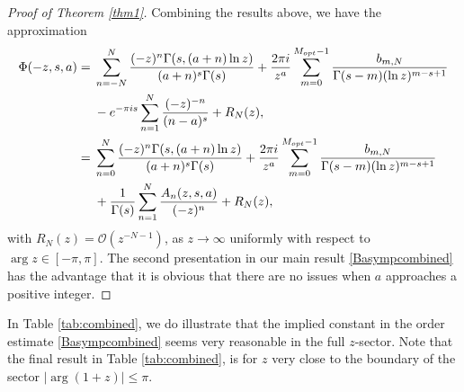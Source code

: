 \documentclass[11pt]{article}
\numberwithin{equation}{section}
\numberwithin{equation}{section}
\def\expe{{\rm e}}
\def\iunit{{\rm i}}
\def\bigO{{\mathcal O}}
\begin{document}
\begin{proof}[Proof of Theorem \ref{thm1}]
Combining the results above, we have the approximation
\begin{align}
 \Phi(-z,s,a)={}&
 \sum_{n=-N}^N \frac{(-z)^n \Gamma(s,(a+n)\ln z)}{(a+n)^s\Gamma(s)}
 +\frac{2\pi\iunit}{z^{a}}\sum_{m=0}^{M_{\rm opt}-1}
 \frac{b_{m,N}}{\Gamma(s-m)(\ln z)^{m-s+1}}\nonumber\\
 & -\expe^{-\pi\iunit s}\sum_{n=1}^N\frac{(-z)^{-n}}{(n-a)^s}
 +R_N(z),\nonumber\\
 ={}& \sum_{n=0}^N \frac{(-z)^n \Gamma(s,(a+n)\ln z)}{(a+n)^s\Gamma(s)}
 +\frac{2\pi\iunit}{z^{a}}\sum_{m=0}^{M_{\rm opt}-1}
 \frac{b_{m,N}}{\Gamma(s-m)(\ln z)^{m-s+1}}\nonumber\\
 & +\frac1{\Gamma(s)}\sum_{n=1}^N \frac{A_n(z,s,a)}{(-z)^n}+R_N(z),\label{Basympcombined}
\end{align}
with $R_N(z)=\bigO\left(z^{-N-1}\right)$, as $z\to\infty$ uniformly with respect to
$\arg z\in[-\pi,\pi]$. The second presentation in our main result \eqref{Basympcombined} has
the advantage that it is obvious that there are no issues when $a$ approaches a positive integer.
\end{proof}

In Table \ref{tab:combined}, we do illustrate that the implied constant in the order
estimate \eqref{Basympcombined} seems very reasonable in the full $z$-sector.
Note that the final result in Table \ref{tab:combined}, is for $z$ very close to
the boundary of the sector $|\arg(1+z)|\leq\pi$.
\end{document}
